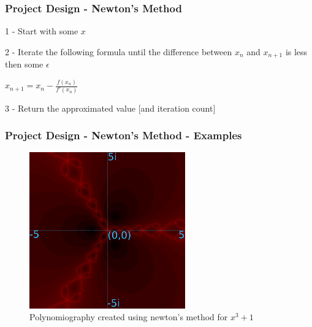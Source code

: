 \documentclass{beamer}
\begin{document}
\begin{contents}
        \frametitle{{\color{white} Project Design - Newton's Method}}
        \begin{itemize}
            \item 1 - Start with some $x$
            \item 2 - Iterate the following formula until the difference between $x_n$ and $x_{n+1}$ is less then some $\epsilon$
            \begin{center}
            \item \( x_{n+1} = x_n - \frac{f(x_n)}{f'(x_n)} \)
            \end{center}
            \item
            \item 3 - Return the approximated value [and iteration count]
        \end{itemize}
\end{contents}

\begin{contents}
        \frametitle{{\color{white} Project Design - Newton's Method - Examples}}
	\begin{figure}[h]
		\centering
		\caption{Polynomiography created using newton's method for $x^3 + 1$}
		\includegraphics[width=0.6\textwidth]{fig4}
	\end{figure}
\end{contents}
\end{document}
